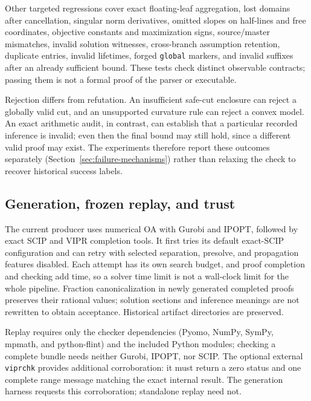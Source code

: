Other targeted regressions cover exact floating-leaf aggregation, lost domains after cancellation, singular norm derivatives, omitted slopes on half-lines and free coordinates, objective constants and maximization signs, source/master mismatches, invalid solution witnesses, cross-branch assumption retention, duplicate entries, invalid lifetimes, forged \texttt{global} markers, and invalid suffixes after an already sufficient bound. These tests check distinct observable contracts; passing them is not a formal proof of the parser or executable.

Rejection differs from refutation. An insufficient safe-cut enclosure can reject a globally valid cut, and an unsupported curvature rule can reject a convex model. An exact arithmetic audit, in contrast, can establish that a particular recorded inference is invalid; even then the final bound may still hold, since a different valid proof may exist. The experiments therefore report these outcomes separately (Section~\ref{sec:failure-mechanisms}) rather than relaxing the check to recover historical success labels.

\subsection{Generation, frozen replay, and trust}
\label{sec:trust}
The current producer uses numerical OA with Gurobi and IPOPT, followed by exact SCIP and VIPR completion tools. It first tries its default exact-SCIP configuration and can retry with selected separation, presolve, and propagation features disabled. Each attempt has its own search budget, and proof completion and checking add time, so a solver time limit is not a wall-clock limit for the whole pipeline. Fraction canonicalization in newly generated completed proofs preserves their rational values; solution sections and inference meanings are not rewritten to obtain acceptance. Historical artifact directories are preserved.

Replay requires only the checker dependencies (Pyomo, NumPy, SymPy, mpmath, and python-flint) and the included Python modules; checking a complete bundle needs neither Gurobi, IPOPT, nor SCIP. The optional external \texttt{viprchk} provides additional corroboration: it must return a zero status and one complete range message matching the exact internal result. The generation harness requests this corroboration; standalone replay need not.

